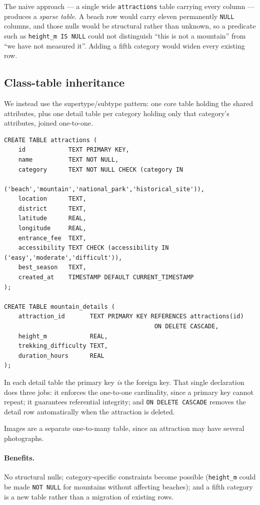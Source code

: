 \documentclass[11pt,a4paper]{article}
\begin{document}
The naive approach --- a single wide \texttt{attractions} table carrying every
column --- produces a \emph{sparse table}. A beach row would carry eleven
permanently \texttt{NULL} columns, and those nulls would be structural rather
than unknown, so a predicate such as \texttt{height\_m IS NULL} could not
distinguish ``this is not a mountain'' from ``we have not measured it''. Adding
a fifth category would widen every existing row.

\subsection{Class-table inheritance}

We instead use the supertype/subtype pattern: one core table holding the shared
attributes, plus one detail table per category holding only that category's
attributes, joined one-to-one.

\begin{lstlisting}[language=sqlx,caption={Core table and one representative
detail table.}]
CREATE TABLE attractions (
    id            TEXT PRIMARY KEY,
    name          TEXT NOT NULL,
    category      TEXT NOT NULL CHECK (category IN
                    ('beach','mountain','national_park','historical_site')),
    location      TEXT,
    district      TEXT,
    latitude      REAL,
    longitude     REAL,
    entrance_fee  TEXT,
    accessibility TEXT CHECK (accessibility IN ('easy','moderate','difficult')),
    best_season   TEXT,
    created_at    TIMESTAMP DEFAULT CURRENT_TIMESTAMP
);

CREATE TABLE mountain_details (
    attraction_id       TEXT PRIMARY KEY REFERENCES attractions(id)
                                          ON DELETE CASCADE,
    height_m            REAL,
    trekking_difficulty TEXT,
    duration_hours      REAL
);
\end{lstlisting}

In each detail table the primary key \emph{is} the foreign key. That single
declaration does three jobs: it enforces the one-to-one cardinality, since a
primary key cannot repeat; it guarantees referential integrity; and
\texttt{ON DELETE CASCADE} removes the detail row automatically when the
attraction is deleted.

Images are a separate one-to-many table, since an attraction may have several
photographs.

\paragraph{Benefits.} No structural nulls; category-specific constraints become
possible (\texttt{height\_m} could be made \texttt{NOT NULL} for mountains
without affecting beaches); and a fifth category is a new table rather than a
migration of existing rows.
\end{document}
